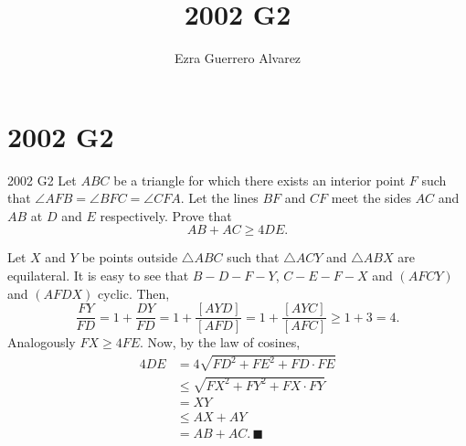 \documentclass[14pt]{article}
\title{2002 G2}
\author{Ezra Guerrero Alvarez}
\begin{document}
\maketitle
	
\section*{2002 G2}

\begin{statement}{2002 G2}
	Let $ABC$ be a triangle for which there exists an interior point $F$ such that $\angle AFB=\angle BFC=\angle CFA$. Let the lines $BF$ and $CF$ meet the sides $AC$ and $AB$ at $D$ and $E$ respectively. Prove that
	\[ AB+AC\geq4DE. \]
\end{statement}
Let $X$ and $Y$ be points outside $\triangle ABC$ such that $\triangle ACY$ and $\triangle ABX$ are equilateral. It is easy to see that $B-D-F-Y$, $C-E-F-X$ and $(AFCY)$ and $(AFDX)$ cyclic. Then,
\[ \frac{FY}{FD}=1+\frac{DY}{FD}=1+\frac{[AYD]}{[AFD]}=1+\frac{[AYC]}{[AFC]}\ge1+3=4. \]
Analogously $FX\ge4FE$. Now, by the law of cosines,
\begin{align*}
	4DE&=4\sqrt{FD^2+FE^2+FD\cdot FE}\\
	&\le\sqrt{FX^2+FY^2+FX\cdot FY}\\
	&=XY\\
	&\le AX+AY\\
	&= AB+AC.\,\blacksquare
\end{align*}
	
\end{document}
